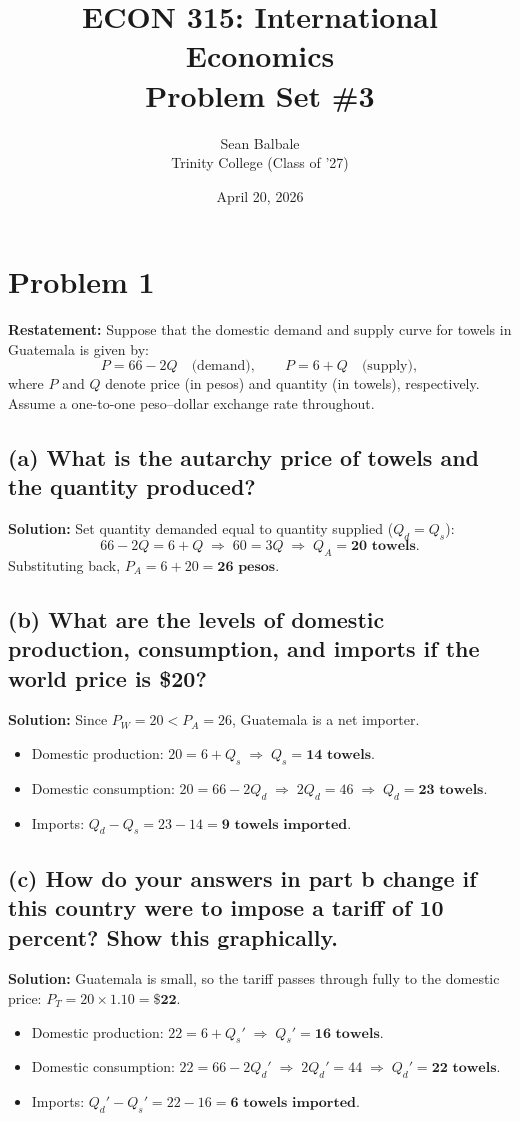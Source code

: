 \documentclass[11pt, letterpaper]{article}
\title{\textbf{ECON 315: International Economics \\ Problem Set \#3}}
\author{Sean Balbale \\ Trinity College (Class of '27)}
\date{April 20, 2026}
\begin{document}
\maketitle

\section*{Problem 1}

\textbf{Restatement:} Suppose that the domestic demand and supply curve for towels in Guatemala is given by:
\[
  P = 66 - 2Q \quad \text{(demand)}, \qquad P = 6 + Q \quad \text{(supply)},
\]
where $P$ and $Q$ denote price (in pesos) and quantity (in towels), respectively. Assume a one-to-one peso--dollar exchange rate throughout.

\subsection*{(a) What is the autarchy price of towels and the quantity produced?}
\noindent \textbf{Solution:} Set quantity demanded equal to quantity supplied ($Q_d = Q_s$):
\[
  66 - 2Q = 6 + Q \;\Longrightarrow\; 60 = 3Q \;\Longrightarrow\; Q_A = \mathbf{20 \text{ towels}}.
\]
Substituting back, $P_A = 6 + 20 = \mathbf{26 \text{ pesos}}$.

\subsection*{(b) What are the levels of domestic production, consumption, and imports if the world price is \$20?}
\noindent \textbf{Solution:} Since $P_W = 20 < P_A = 26$, Guatemala is a net importer.
\begin{itemize}
  \item Domestic production: $20 = 6 + Q_s \;\Longrightarrow\; Q_s = \mathbf{14 \text{ towels}}$.
  \item Domestic consumption: $20 = 66 - 2Q_d \;\Longrightarrow\; 2Q_d = 46 \;\Longrightarrow\; Q_d = \mathbf{23 \text{ towels}}$.
  \item Imports: $Q_d - Q_s = 23 - 14 = \mathbf{9 \text{ towels imported}}$.
\end{itemize}

\subsection*{(c) How do your answers in part b change if this country were to impose a tariff of 10 percent? Show this graphically.}
\noindent \textbf{Solution:} Guatemala is small, so the tariff passes through fully to the domestic price: $P_T = 20 \times 1.10 = \mathbf{\$22}$.
\begin{itemize}
  \item Domestic production: $22 = 6 + Q_s' \;\Longrightarrow\; Q_s' = \mathbf{16 \text{ towels}}$.
  \item Domestic consumption: $22 = 66 - 2Q_d' \;\Longrightarrow\; 2Q_d' = 44 \;\Longrightarrow\; Q_d' = \mathbf{22 \text{ towels}}$.
  \item Imports: $Q_d' - Q_s' = 22 - 16 = \mathbf{6 \text{ towels imported}}$.
\end{itemize}
\end{document}
